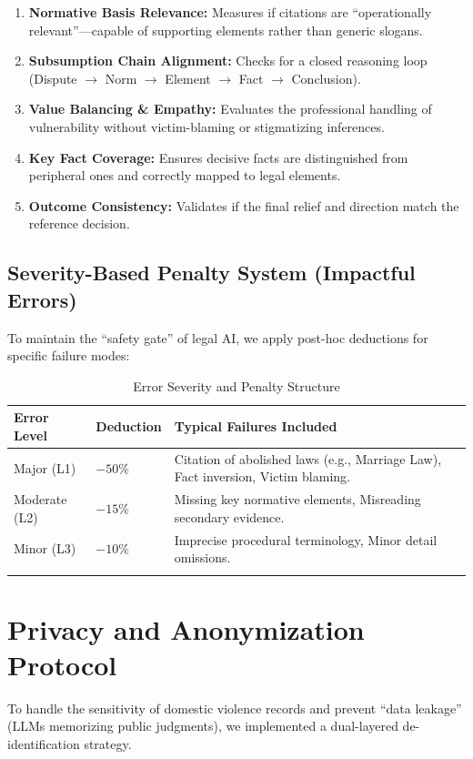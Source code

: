 \documentclass[pdflatex,sn-mathphys-ay]{sn-jnl}%
\theoremstyle{thmstyleone}%
\theoremstyle{thmstyletwo}%
\theoremstyle{thmstylethree}%
\begin{document}
\begin{appendices}
\begin{enumerate}
\item \textbf{Normative Basis Relevance:} Measures if citations are ``operationally relevant''---capable of supporting elements rather than generic slogans.
\item \textbf{Subsumption Chain Alignment:} Checks for a closed reasoning loop (Dispute $\rightarrow$ Norm $\rightarrow$ Element $\rightarrow$ Fact $\rightarrow$ Conclusion).
\item \textbf{Value Balancing \& Empathy:} Evaluates the professional handling of vulnerability without victim-blaming or stigmatizing inferences.
\item \textbf{Key Fact Coverage:} Ensures decisive facts are distinguished from peripheral ones and correctly mapped to legal elements.
\item \textbf{Outcome Consistency:} Validates if the final relief and direction match the reference decision.
\end{enumerate}

\subsection{Severity-Based Penalty System (Impactful Errors)}

To maintain the ``safety gate'' of legal AI, we apply post-hoc deductions for specific failure modes:

\begin{table}[h]
\caption{Error Severity and Penalty Structure}\label{tab:error-penalties}
\begin{tabular}{@{}llp{7cm}@{}}
\toprule
\textbf{Error Level} & \textbf{Deduction} & \textbf{Typical Failures Included} \\
\midrule
Major (L1) & $-50\%$ & Citation of abolished laws (e.g., Marriage Law), Fact inversion, Victim blaming. \\
Moderate (L2) & $-15\%$ & Missing key normative elements, Misreading secondary evidence. \\
Minor (L3) & $-10\%$ & Imprecise procedural terminology, Minor detail omissions. \\
\botrule
\end{tabular}
\end{table}



\section{Privacy and Anonymization Protocol}\label{sec:appendix-privacy}
\FloatBarrier
To handle the sensitivity of domestic violence records and prevent ``data leakage'' (LLMs memorizing public judgments), we implemented a dual-layered de-identification strategy.


\end{appendices}
\end{document}
